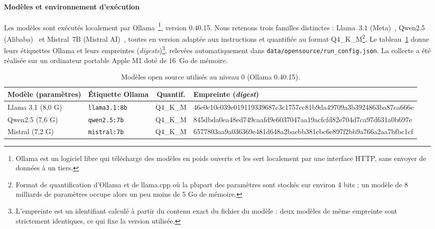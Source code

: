 \documentclass[11pt,a4paper]{article}
\newcommand{\code}[1]{\texttt{#1}}
\begin{document}
\paragraph{Modèles et environnement d'exécution} Les modèles sont exécutés localement par Ollama~\cite{ollama}\footnote{Ollama est un logiciel libre qui télécharge des modèles en poids ouverts et les sert localement par une interface HTTP, sans envoyer de données à un tiers.}, version 0.40.15. Nous retenons trois familles distinctes : Llama~3.1 (Meta)~\cite{llama3}, Qwen2.5 (Alibaba)~\cite{qwen25} et Mistral~7B (Mistral AI)~\cite{mistral}, toutes en version adaptée aux instructions et quantifiée au format Q4\_K\_M\footnote{Format de quantification d'Ollama et de llama.cpp où la plupart des paramètres sont stockés sur environ 4 bits ; un modèle de 8 milliards de paramètres occupe alors un peu moins de 5 Go de mémoire.}. Le tableau~\ref{tab:modeles} donne leurs étiquettes Ollama et leurs empreintes (\emph{digests})\footnote{L'empreinte est un identifiant calculé à partir du contenu exact du fichier du modèle : deux modèles de même empreinte sont strictement identiques, ce qui fixe la version utilisée.}, relevées automatiquement dans \code{data/opensource/run\_config.json}. La collecte a été réalisée sur un ordinateur portable Apple M1 doté de 16~Go de mémoire.

\begin{table}[htbp]
\centering
\caption{Modèles open source utilisés au niveau 0 (Ollama 0.40.15).}
\label{tab:modeles}
\footnotesize\setlength{\tabcolsep}{3pt}
\begin{tabular}{@{}llcl@{}}
\toprule
Modèle (paramètres) & Étiquette Ollama & Quantif. & Empreinte (\emph{digest}) \\
\midrule
Llama 3.1 (8,0 G) & \code{llama3.1:8b} & Q4\_K\_M & {\scriptsize\ttfamily 46e0c10c039e019119339687c3c1757cc81b9da49709a3b3924863ba87ca666e} \\
Qwen2.5 (7,6 G) & \code{qwen2.5:7b} & Q4\_K\_M & {\scriptsize\ttfamily 845dbda0ea48ed749caafd9e6037047aa19acfcfd82e704d7ca97d631a0b697e} \\
Mistral (7,2 G) & \code{mistral:7b} & Q4\_K\_M & {\scriptsize\ttfamily 6577803aa9a036369e481d648a2baebb381ebc6e897f2bb9a766a2aa7bfbc1cf} \\
\bottomrule
\end{tabular}
\end{table}
\end{document}
